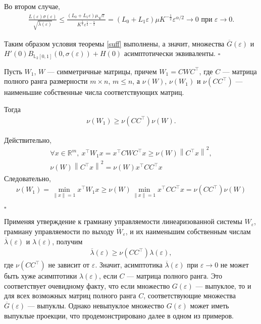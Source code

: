 \documentclass[../main.tex]{subfiles}
\begin{document}
 Во втором случае,
 \begin{gather*}
 \frac{L(\varepsilon) \sigma(\varepsilon)}{\sqrt{\overline{\lambda}(\varepsilon)}} 
 \leqslant
 \frac{(L_0+L_1\varepsilon)\mu\sqrt{\varepsilon}}{{K^{\frac{1}{2}}}\varepsilon^{\frac{1}{2}-\frac{\alpha}{2}}}
 =
 (L_0+L_1\varepsilon)\mu K^{-\frac{1}{2}}\varepsilon^{\alpha/2} \rightarrow 0 \mbox{\ при\ } \varepsilon \rightarrow 0.
 \end{gather*}
 
 Таким образом условия теоремы \ref{suff} выполнены, а значит, множества $ \overline{G}(\varepsilon) $ и \\$ H'(0)B_{\mathbb{L}_2[0,1]}(0,\sigma(\varepsilon))+ H(0) $ асимптотически эквиваленты.
 \hfill $\square$
 \begin{utv}
 Пусть $ W_1 $, $ W $ --- симметричные матрицы, причем $ W_1 = C W C^{\top} $, где $ C $ --- матрица полного ранга размерности $ m \times n $, $ m \leqslant n $, а $ \nu(W) $, $ \nu(W_1) $ и $ \nu(CC^{\top}) $ --- наименьшие собственные числа соответствующих матриц.
 
 Тогда
 \begin{gather*}
 \nu(W_1) \geqslant \nu(CC^{\top}) \nu(W).
 \end{gather*}
 \end{utv}
 \doc 
 Действительно,
 \begin{gather*}
 \forall x \in \mathbb{R}^m, \: x^{\top} W_1 x = x^{\top} C W C^{\top} x \geqslant \nu(W)\left\| C^{\top}x \right\| ^2,\\
 \nu(W)\left\| C^{\top}x \right\| ^2 = \nu(W) x^{\top} C C^{\top} x
 \end{gather*}
 Следовательно,
 \begin{gather*}
 \nu(W_1) = \min \limits_{\left\| x\right\| =1}x^{\top}W_1x \geqslant \nu(W)\min \limits_{\left\| x\right\| =1}x^{\top}CC^{\top}x = \nu(CC^{\top}) \nu(W) 
 \end{gather*} \begin{flushright}
 \hfill $ \square $
 \end{flushright}
 
 Применяя утверждение к грамиану управляемости линеаризованной системы $ W_{\varepsilon} $, грамиану управляемости по выходу $ \overline{W}_{\varepsilon}$, и их наименьшим собственным числам $ \overline{\lambda}(\varepsilon) $ и $ \lambda(\varepsilon) $, получим
 \begin{gather*}
 \overline{\lambda}(\varepsilon) \geqslant \nu(CC^{\top}) \lambda(\varepsilon),
 \end{gather*}
 где $ \nu(CC^{\top}) $ не зависит от $ \varepsilon $. 
 Значит, асимптотика $ \overline{\lambda}(\varepsilon) $ при $\varepsilon \rightarrow 0$ не может быть хуже асимптотики $ \lambda(\varepsilon) $, если $ C $ --- матрица полного ранга. 
 Это соответствует очевидному факту, что если множество $ G(\varepsilon) $ --- выпуклое, то и для всех возможных матриц полного ранга $ C $, соответствующие множества $ \overline{G}(\varepsilon) $ --- выпуклы. 
 Однако невыпуклое множество $ G(\varepsilon) $ может иметь выпуклые проекции, что продемонстрировано далее в одном из примеров.
 
\end{document}
